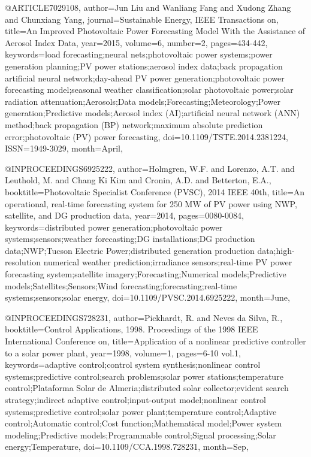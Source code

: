 @ARTICLE{7029108, 
author={Jun Liu and Wanliang Fang and Xudong Zhang and Chunxiang Yang}, 
journal={Sustainable Energy, IEEE Transactions on}, 
title={An Improved Photovoltaic Power Forecasting Model With the Assistance of Aerosol Index Data}, 
year={2015}, 
volume={6}, 
number={2}, 
pages={434-442}, 
keywords={load forecasting;neural nets;photovoltaic power systems;power generation planning;PV power stations;aerosol index data;back propagation artificial neural network;day-ahead PV power generation;photovoltaic power forecasting model;seasonal weather classification;solar photovoltaic power;solar radiation attenuation;Aerosols;Data models;Forecasting;Meteorology;Power generation;Predictive models;Aerosol index (AI);artificial neural network (ANN) method;back propagation (BP) network;maximum absolute prediction error;photovoltaic (PV) power forecasting}, 
doi={10.1109/TSTE.2014.2381224}, 
ISSN={1949-3029}, 
month={April},}

@INPROCEEDINGS{6925222, 
author={Holmgren, W.F. and Lorenzo, A.T. and Leuthold, M. and Chang Ki Kim and Cronin, A.D. and Betterton, E.A.}, 
booktitle={Photovoltaic Specialist Conference (PVSC), 2014 IEEE 40th}, 
title={An operational, real-time forecasting system for 250 MW of PV power using NWP, satellite, and DG production data}, 
year={2014}, 
pages={0080-0084}, 
keywords={distributed power generation;photovoltaic power systems;sensors;weather forecasting;DG installations;DG production data;NWP;Tucson Electric Power;distributed generation production data;high-resolution numerical weather prediction;irradiance sensors;real-time PV power forecasting system;satellite imagery;Forecasting;Numerical models;Predictive models;Satellites;Sensors;Wind forecasting;forecasting;real-time systems;sensors;solar energy}, 
doi={10.1109/PVSC.2014.6925222}, 
month={June},}

@INPROCEEDINGS{728231, 
author={Pickhardt, R. and Neves da Silva, R.}, 
booktitle={Control Applications, 1998. Proceedings of the 1998 IEEE International Conference on}, 
title={Application of a nonlinear predictive controller to a solar power plant}, 
year={1998}, 
volume={1}, 
pages={6-10 vol.1}, 
keywords={adaptive control;control system synthesis;nonlinear control systems;predictive control;search problems;solar power stations;temperature control;Plataforma Solar de Almeria;distributed solar collector;evident search strategy;indirect adaptive control;input-output model;nonlinear control systems;predictive control;solar power plant;temperature control;Adaptive control;Automatic control;Cost function;Mathematical model;Power system modeling;Predictive models;Programmable control;Signal processing;Solar energy;Temperature}, 
doi={10.1109/CCA.1998.728231}, 
month={Sep},}

